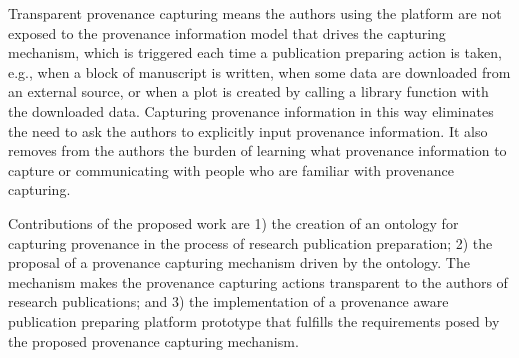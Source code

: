 Transparent provenance capturing means the authors using the platform are not exposed to the provenance information model that drives the capturing mechanism, which is triggered each time a publication preparing action is taken, e.g., when a block of manuscript is written, when some data are downloaded from an external source, or when a plot is created by calling a library function with the downloaded data. Capturing provenance information in this way eliminates the need to ask the authors to explicitly input provenance information. It also removes from the authors the burden of learning what provenance information to capture or communicating with people who are familiar with provenance capturing.

Contributions of the proposed work are 1) the creation of an ontology for capturing provenance in the process of research publication preparation; 2) the proposal of a provenance capturing mechanism driven by the ontology. The mechanism makes the provenance capturing actions transparent to the authors of research publications; and 3) the implementation of a provenance aware publication preparing platform prototype that fulfills the requirements posed by the proposed provenance capturing mechanism.

%
%
%
%
